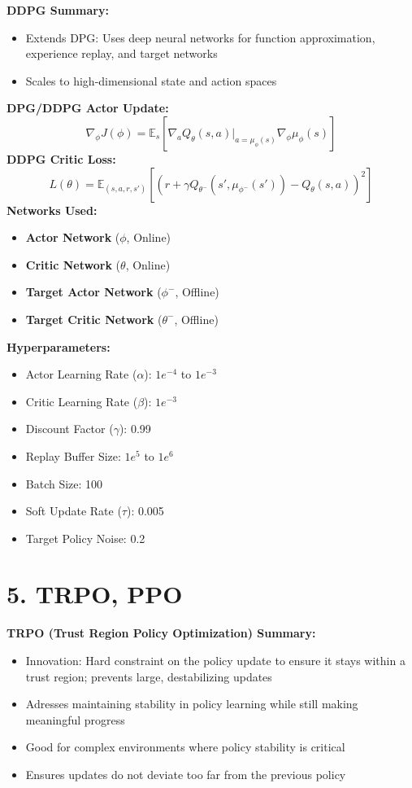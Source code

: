 \documentclass[a4paper,10pt]{article}
\begin{document}
\begin{multicols}{2}
\noindent \textbf{DDPG Summary:}
\begin{itemize}
    \item Extends DPG: Uses deep neural networks for function approximation, experience replay, and target networks
    \item Scales to high-dimensional state and action spaces
\end{itemize}

\noindent \textbf{DPG/DDPG Actor Update:}
\[
\nabla_\phi J(\phi) = \mathbb{E}_s \left[ \nabla_a Q_\theta(s, a) \big|_{a=\mu_\phi(s)} \nabla_\phi \mu_\phi(s) \right]
\]
\textbf{DDPG Critic Loss:}
\[
L(\theta) = \mathbb{E}_{(s, a, r, s')} \left[ \left( r + \gamma Q_{\theta^-}(s', \mu_{\phi^-}(s')) - Q_\theta(s, a) \right)^2 \right]
\]
\textbf{Networks Used:}
\begin{itemize}
    \item \textbf{Actor Network} (\(\phi\), Online)
    \item \textbf{Critic Network} (\(\theta\), Online)
    \item \textbf{Target Actor Network} (\(\phi^-\), Offline)
    \item \textbf{Target Critic Network} (\(\theta^-\), Offline)
\end{itemize}
\textbf{Hyperparameters:}
\begin{itemize}
    \item Actor Learning Rate (\(\alpha\)): \(1e^{-4}\) to \(1e^{-3}\)
    \item Critic Learning Rate (\(\beta\)): \(1e^{-3}\)
    \item Discount Factor (\(\gamma\)): 0.99
    \item Replay Buffer Size: \(1e^5\) to \(1e^6\)
    \item Batch Size: 100
    \item Soft Update Rate (\(\tau\)): 0.005
    \item Target Policy Noise: 0.2
\end{itemize}

\section*{5. TRPO, PPO}
\textbf{TRPO (Trust Region Policy Optimization) Summary:}
\begin{itemize}
    \item Innovation: Hard constraint on the policy update to ensure it stays within a trust region; prevents large, destabilizing updates
    \item Adresses maintaining stability in policy learning while still making meaningful progress
    \item Good for complex environments where policy stability is critical
    \item Ensures updates do not deviate too far from the previous policy
\end{itemize}


\end{multicols}
\end{document}
